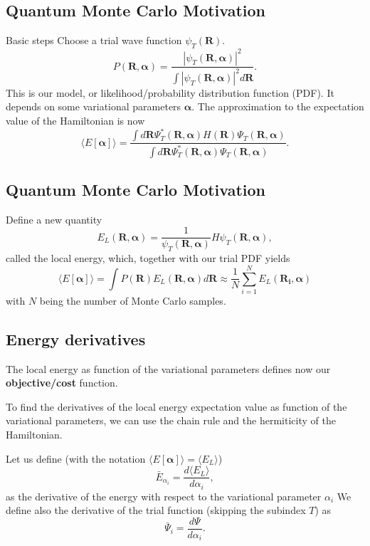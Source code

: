 \documentclass[%
oneside,                 %
final,                   %
10pt]{article}
\begin{document}
\subsection{Quantum Monte Carlo Motivation}
\begin{block}{Basic steps }
Choose a trial wave function
$\psi_T(\bm{R})$.
\[
   P(\bm{R},\bm{\alpha})= \frac{\left|\psi_T(\bm{R},\bm{\alpha})\right|^2}{\int \left|\psi_T(\bm{R},\bm{\alpha})\right|^2d\bm{R}}.
\]
This is our model, or likelihood/probability distribution function  (PDF). It depends on some variational parameters $\bm{\alpha}$.
The approximation to the expectation value of the Hamiltonian is now 
\[
   \langle E[\bm{\alpha}] \rangle = 
   \frac{\int d\bm{R}\Psi^{\ast}_T(\bm{R},\bm{\alpha})H(\bm{R})\Psi_T(\bm{R},\bm{\alpha})}
        {\int d\bm{R}\Psi^{\ast}_T(\bm{R},\bm{\alpha})\Psi_T(\bm{R},\bm{\alpha})}.
\]
\end{block}

\subsection{Quantum Monte Carlo Motivation}
\begin{block}{Define a new quantity }
\[
   E_L(\bm{R},\bm{\alpha})=\frac{1}{\psi_T(\bm{R},\bm{\alpha})}H\psi_T(\bm{R},\bm{\alpha}),
\]
called the local energy, which, together with our trial PDF yields
\[
  \langle E[\bm{\alpha}] \rangle=\int P(\bm{R})E_L(\bm{R},\bm{\alpha}) d\bm{R}\approx \frac{1}{N}\sum_{i=1}^NE_L(\bm{R_i},\bm{\alpha})
\]
with $N$ being the number of Monte Carlo samples.
\end{block}

\subsection{Energy derivatives}
\begin{block}{}
The local energy as function of the variational parameters defines now our \textbf{objective/cost} function.

To find the derivatives of the local energy expectation value as function of the variational parameters, we can use the chain rule and the hermiticity of the Hamiltonian.  

Let us define (with the notation $\langle E[\bm{\alpha}]\rangle =\langle  E_L\rangle$)
\[
\bar{E}_{\alpha_i}=\frac{d\langle  E_L\rangle}{d\alpha_i},
\]
as the derivative of the energy with respect to the variational parameter $\alpha_i$
We define also the derivative of the trial function (skipping the subindex $T$) as 
\[
\bar{\Psi}_{i}=\frac{d\Psi}{d\alpha_i}.
\]
\end{block}
\end{document}
